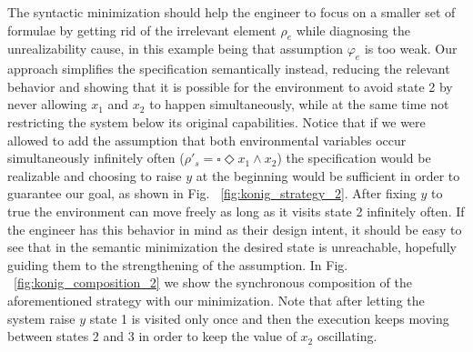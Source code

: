 The syntactic minimization should help the engineer to focus on a smaller set of formulae by getting rid of the irrelevant element $\rho_e$ while diagnosing the unrealizability cause, in this example being that assumption $\varphi_e$ is too weak. Our approach simplifies the specification semantically instead, reducing the relevant behavior and showing that it is possible for the environment to avoid state 2 by never allowing $x_1$ and $x_2$ to happen simultaneously, while at the same time not restricting the system below its original capabilities. Notice that if we were allowed to add the assumption that both environmental variables occur simultaneously infinitely often ($\rho'_s = \square \Diamond x_1 \wedge x_2$) the specification would be realizable and choosing to raise $y$ at the beginning would be sufficient in order to guarantee our goal, as shown in Fig. ~\ref{fig:konig_strategy_2}. After fixing $y$ to true the environment can move freely as long as it visits state 2 infinitely often. If the engineer has this behavior in mind as their design intent, it should be easy to see that in the semantic minimization the desired state is unreachable, hopefully guiding them to the strengthening of the assumption.  In Fig. ~\ref{fig:konig_composition_2} we show the synchronous composition of the aforementioned strategy with our minimization. Note that after letting the system raise $y$ state 1 is visited only once and then the execution keeps moving between states 2 and 3 in order to keep the value of $x_2$ oscillating.


